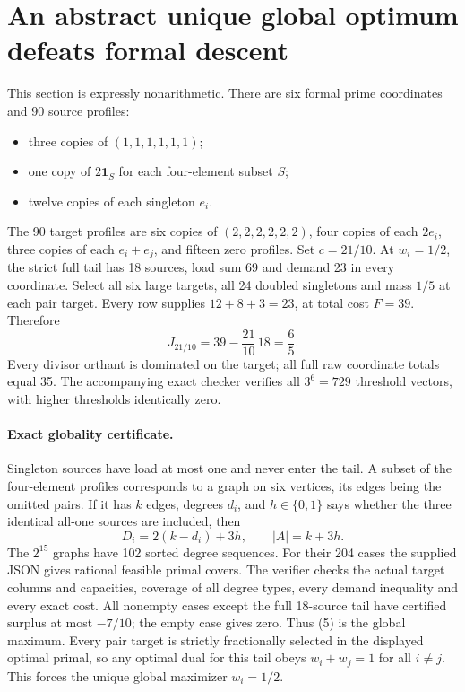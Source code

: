 \documentclass[11pt]{article}
\begin{document}
\section{An abstract unique global optimum defeats formal descent}
This section is expressly nonarithmetic. There are six formal prime
coordinates and 90 source profiles:
\begin{itemize}
\item three copies of $(1,1,1,1,1,1)$;
\item one copy of $2\mathbf1_S$ for each four-element subset $S$;
\item twelve copies of each singleton $e_i$.
\end{itemize}
The 90 target profiles are six copies of $(2,2,2,2,2,2)$, four copies of
each $2e_i$, three copies of each $e_i+e_j$, and fifteen zero profiles.
Set $c=21/10$. At $w_i=1/2$, the strict full tail has 18 sources, load
sum 69 and demand 23 in every coordinate. Select all six large targets,
all 24 doubled singletons and mass $1/5$ at each pair target. Every row
supplies $12+8+3=23$, at total cost $F=39$. Therefore
\[
 J_{21/10}=39-\frac{21}{10}\,18=\frac65.\tag{5}
\]
Every divisor orthant is dominated on the target; all full raw coordinate
totals equal 35. The accompanying exact checker verifies all $3^6=729$
threshold vectors, with higher thresholds identically zero.

\paragraph{Exact globality certificate.}
Singleton sources have load at most one and never enter the tail.
A subset of the four-element profiles corresponds to a graph on six
vertices, its edges being the omitted pairs. If it has $k$ edges, degrees
$d_i$, and $h\in\{0,1\}$ says whether the three identical all-one sources
are included, then
\[
 D_i=2(k-d_i)+3h,\qquad |A|=k+3h.\tag{6}
\]
The $2^{15}$ graphs have 102 sorted degree sequences. For their 204
cases the supplied JSON gives rational feasible primal covers. The
verifier checks the actual target columns and capacities, coverage of
all degree types, every demand inequality and every exact cost.
All nonempty cases except the full 18-source tail have certified surplus
at most $-7/10$; the empty case gives zero. Thus (5) is the global maximum.
Every pair target is strictly fractionally selected in the displayed
optimal primal, so any optimal dual for this tail obeys $w_i+w_j=1$
for all $i\ne j$. This forces the unique global maximizer $w_i=1/2$.
\end{document}
